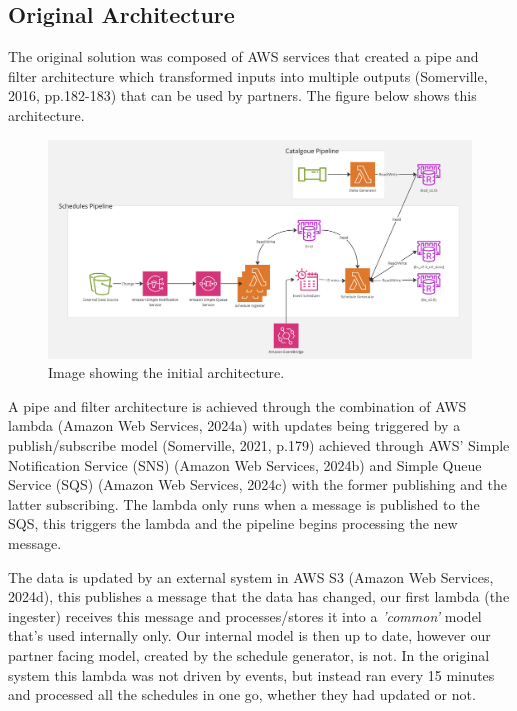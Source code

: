   \newpage
  \subsection{Original Architecture}
  The original solution was composed of AWS services that created a pipe and filter architecture which transformed inputs into multiple outputs 
  (Somerville, 2016, pp.182-183) that can be used by partners. The figure below shows this architecture.
  
  \begin{figure}[H]
    \centering
    \includegraphics[width=12cm]{assets/architectures/starting.png}
    \caption{Image showing the initial architecture.}
    \label{fig:initialArchitecture}
  \end{figure}

  A pipe and filter architecture is achieved through the combination of AWS lambda (Amazon Web Services, 2024a) with updates being triggered by a publish/subscribe 
  model (Somerville, 2021, p.179) achieved through AWS' Simple Notification Service (SNS) (Amazon Web Services, 2024b) and Simple Queue Service (SQS) 
  (Amazon Web Services, 2024c) with the former publishing and the latter subscribing. The lambda only runs when a message is published to the SQS, this triggers 
  the lambda and the pipeline begins processing the new message.

  The data is updated by an external system in AWS S3 (Amazon Web Services, 2024d), this publishes a message that the data has changed, our first lambda 
  (the ingester) receives this message and processes/stores it into a \textit{'common'} model that's used internally only. Our internal model is then up to date,
  however our partner facing model, created by the schedule generator, is not. In the original system this lambda was not driven by events, but instead ran every
  15 minutes and processed all the schedules in one go, whether they had updated or not. 
  
